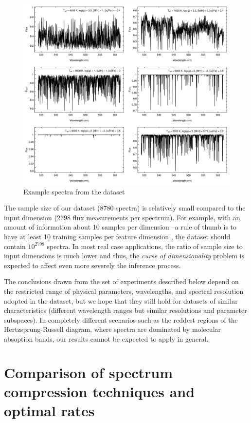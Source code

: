 \documentclass[a4paper,fleqn,usenatbib]{mnras}
\begin{document}
{{{\begin{figure}
\centering\includegraphics[width=\textwidth]{espectros.pdf}
\caption{Example spectra from the dataset}
\label{fig:ejemplosEspectros}
\end{figure}

The sample size of our dataset (8780 spectra) is relatively
small compared to the input dimension (2798 flux measurements
per spectrum). For example, with an amount of information 
about 10 samples per dimension --a rule of thumb is to have at 
least 10 training samples per feature dimension \citep{jain:00}, 
the dataset should contain $10^{2798}$ spectra.
In most real case applications, the ratio of sample size to input 
dimensions is much lower and thus, the \textit{curse of dimensionality} 
problem is expected to affect even more severely the inference process. 

The conclusions drawn from the set of experiments described below
depend on the restricted range of physical parameters, wavelengths,
and spectral resolution adopted in the dataset, but we hope that they
still hold for datasets of similar characteristics (different
wavelength ranges but similar resolutions and parameter subspaces). In
completely different scenarios such as the reddest regions of the
Hertzsprung-Russell diagram, where spectra are dominated by molecular
absoption bands, our results cannot be expected to apply in general.

\section{Comparison of spectrum compression techniques and optimal rates}
\label{sec:comparison1}

}}}
\end{document}
